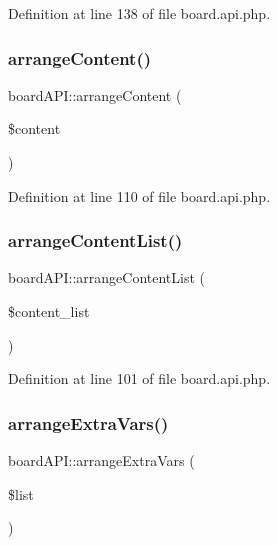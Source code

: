 Definition at line 138 of file board.\+api.\+php.

\mbox{\label{classboardAPI_a8c3e9522bfba03480917fd7485de99c9}} 
\subsubsection{\texorpdfstring{arrange\+Content()}{arrangeContent()}}
{\footnotesize\ttfamily board\+A\+P\+I\+::arrange\+Content (\begin{DoxyParamCaption}\item[{}]{\$content }\end{DoxyParamCaption})}



Definition at line 110 of file board.\+api.\+php.

\mbox{\label{classboardAPI_ade487a5bde6abbc987dbe44f8adf8c22}} 
\subsubsection{\texorpdfstring{arrange\+Content\+List()}{arrangeContentList()}}
{\footnotesize\ttfamily board\+A\+P\+I\+::arrange\+Content\+List (\begin{DoxyParamCaption}\item[{}]{\$content\+\_\+list }\end{DoxyParamCaption})}



Definition at line 101 of file board.\+api.\+php.

\mbox{\label{classboardAPI_a80b7a5fb897ce7a42ff20c05f36b6522}} 
\subsubsection{\texorpdfstring{arrange\+Extra\+Vars()}{arrangeExtraVars()}}
{\footnotesize\ttfamily board\+A\+P\+I\+::arrange\+Extra\+Vars (\begin{DoxyParamCaption}\item[{}]{\$list }\end{DoxyParamCaption})}



